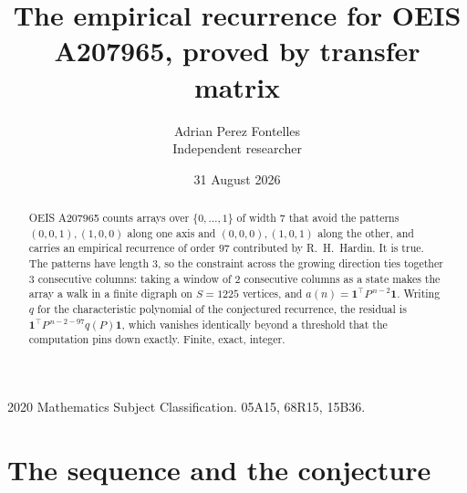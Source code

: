 \documentclass[11pt,a4paper]{article}
\title{The empirical recurrence for OEIS A207965, proved by transfer matrix}
\author{Adrian Perez Fontelles\\ \small Independent researcher}
\date{31 August 2026}
\theoremstyle{plain}
\theoremstyle{definition}
\begin{document}
\maketitle

\begin{abstract}
OEIS A207965 counts arrays over $\{0,\dots,1\}$ of width $7$ that avoid the patterns
$(0,0,1), (1,0,0)$ along one axis and $(0,0,0), (1,0,1)$ along the other, and carries an empirical recurrence of
order $97$ contributed by R.~H.~Hardin. It is true. The patterns have length $3$, so
the constraint across the growing direction ties together $3$ consecutive columns: taking a
window of $2$ consecutive columns as a state makes the array a walk in a finite digraph
on $S=1225$ vertices, and $a(n)=\mathbf{1}^{\!\top}P^{\,n-2}\mathbf{1}$. Writing $q$
for the characteristic polynomial of the conjectured recurrence, the residual is
$\mathbf{1}^{\!\top}P^{\,n-2-97}q(P)\mathbf{1}$, which vanishes identically
beyond a threshold that the computation pins down exactly. Finite, exact, integer.
\end{abstract}

\noindent\small 2020 Mathematics Subject Classification. 05A15, 68R15, 15B36.\normalsize

\section{The sequence and the conjecture}
\end{document}
